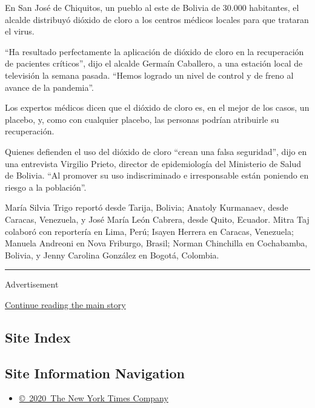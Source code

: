 En San José de Chiquitos, un pueblo al este de Bolivia de 30.000
habitantes, el alcalde distribuyó dióxido de cloro a los centros médicos
locales para que trataran el virus.

``Ha resultado perfectamente la aplicación de dióxido de cloro en la
recuperación de pacientes críticos'', dijo el alcalde Germaín Caballero,
a una estación local de televisión la semana pasada. ``Hemos logrado un
nivel de control y de freno al avance de la pandemia''.

Los expertos médicos dicen que el dióxido de cloro es, en el mejor de
los casos, un placebo, y, como con cualquier placebo, las personas
podrían atribuirle su recuperación.

Quienes defienden el uso del dióxido de cloro ``crean una falsa
seguridad'', dijo en una entrevista Virgilio Prieto, director de
epidemiología del Ministerio de Salud de Bolivia. ``Al promover su uso
indiscriminado e irresponsable están poniendo en riesgo a la
población''.

María Silvia Trigo reportó desde Tarija, Bolivia; Anatoly Kurmanaev,
desde Caracas, Venezuela, y José María León Cabrera, desde Quito,
Ecuador. Mitra Taj colaboró con reportería en Lima, Perú; Isayen Herrera
en Caracas, Venezuela; Manuela Andreoni en Nova Friburgo, Brasil; Norman
Chinchilla en Cochabamba, Bolivia, y Jenny Carolina González en Bogotá,
Colombia.

\begin{center}\rule{0.5\linewidth}{\linethickness}\end{center}

Advertisement

\protect\hyperlink{after-bottom}{Continue reading the main story}

\hypertarget{site-index}{%
\subsection{Site Index}\label{site-index}}

\hypertarget{site-information-navigation}{%
\subsection{Site Information
Navigation}\label{site-information-navigation}}

\begin{itemize}
\tightlist
\item
  \href{https://help.nytimes3xbfgragh.onion/hc/en-us/articles/115014792127-Copyright-notice}{©~2020~The
  New York Times Company}
\end{itemize}

